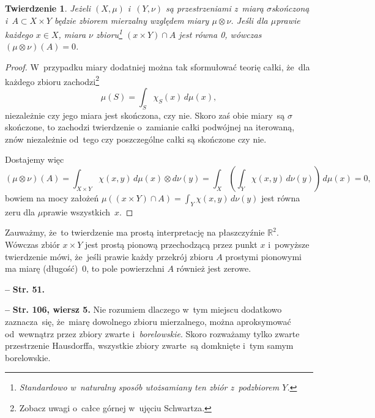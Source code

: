 \documentclass[a4paper,11pt]{article}
\newtheorem{twr}{Twierdzenie}
\newcommand{\spaceFour}{0.5em}
\newcommand{\mb}{\mathbb}
\newcommand{\si}{\sigma}
\newcommand{\R}{\mb{R}}
\newcommand{\subs}{\subset}
\newcommand{\ti}{\times}
\newcommand{\ot}{\otimes}
\newcommand{\tb}{\textbf}
\newcommand{\noi}{\noindent}
\newcommand{\start}{\noi \tb{--} {}}
\newcommand{\Str}[1]{\tb{Str. #1.}}
\newcommand{\StrWg}[2]{\tb{Str. #1, wiersz #2.}}
\begin{document}
\begin{twr}
  \label{twr:miaraA}
  Jeżeli $( X, \mu )$ i~$( Y, \nu )$ są przestrzeniami z~miarą
  $\si$\dywiz skończoną i~$A \subs X \ti Y$ będzie zbiorem mierzalny
  względem miary $\mu \ot \nu$. Jeśli dla $\mu$\dywiz prawie każdego
  $x \in X$, miara $\nu$ zbioru\footnote{Standardowo w~naturalny
    sposób utożsamiany ten zbiór z~podzbiorem $Y$.}
  $( x \ti Y ) \cap A$ jest równa 0, wówczas $(\mu \ot \nu)( A ) = 0$.
\end{twr}
\begin{proof}
  W~przypadku miary dodatniej można tak sformułować teorię całki,
  że~dla każdego zbioru zachodzi\footnote{Zobacz uwagi o~całce górnej
    w~ujęciu Schwartza.}
  \begin{equation*}
    \mu( S ) = \int_{ S } \chi_{ S }( x ) \, d\mu( x ),
  \end{equation*}
  niezależnie czy jego miara jest skończona, czy nie. Skoro zaś obie
  miary~są $\si$\dywiz skończone, to zachodzi twierdzenie o~zamianie
  całki podwójnej na iterowaną, znów niezależnie od~tego czy
  poszczególne całki są skończone czy nie.

  Dostajemy więc
  \begin{equation*}
    (\mu \ot \nu)( A ) = \int_{ X \ti Y } \chi( x, y )
    \, d\mu( x ) \ot d\nu( y )
    = \int_{ X } \left( \int_{ Y } \chi( x, y ) \, d\nu( y ) \right)
    \, d\mu( x ) = 0,
  \end{equation*}
  bowiem na mocy założeń
  $\mu( ( x \ti Y ) \cap A ) = \int_{ Y } \chi( x, y ) \, d\nu( y )$
  jest równa zeru dla $\mu$\dywiz prawie wszystkich~$x$.
\end{proof}
Zauważmy, że~to twierdzenie ma prostą interpretację na płaszczyźnie
$\R^{ 2 }$. Wówczas zbiór $x \ti Y$ jest prostą pionową przechodzącą
przez punkt $x$ i~powyższe twierdzenie mówi, że~jeśli prawie każdy
przekrój zbioru $A$ prostymi pionowymi ma miarę (długość)~0, to pole
powierzchni $A$ również jest zerowe.

\vspace{\spaceFour}


\start \Str{51}

\vspace{\spaceFour}


\start \StrWg{106}{5} Nie rozumiem dlaczego w~tym miejscu dodatkowo
zaznacza~się, że~miarę dowolnego zbioru mierzalnego, można
aproksymować od~wewnątrz przez zbiory zwarte i~\emph{borelowskie}.
Skoro rozważamy tylko zwarte przestrzenie Hausdorffa, wszystkie zbiory
zwarte~są domknięte i~tym samym borelowskie.
\end{document}
